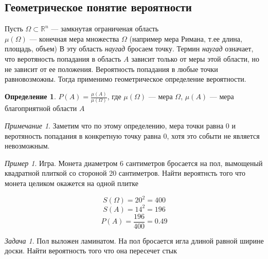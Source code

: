 \documentclass[english]{article}
\newcommand{\R}{\mathbb{R}}
\theoremstyle{plain}
\theoremstyle{remark}
\newtheorem*{remark}{Примечание}
\newtheorem*{task}{Задача}
\newtheorem*{examp}{Пример}
\theoremstyle{definition}
\newtheorem*{definition}{Определение}
\begin{document}
\subsection{Геометрическое понятие вероятности}
\label{sec:orgaa1966d}
Пусть \(\Omega \subset \R^n\)  --- замкнутая ограниченая область \\
\(\mu(\Omega)\) --- конечная мера множества \(\Omega\) (например мера Римана, т.ее длина, площадь, объем) 
В эту область \emph{наугад} бросаем точку. Термин \emph{наугад} означает, что веротяность попадания в область \(A\)
зависит только от меры этой области, но не зависит от ее положения. Вероятность попадания в любые точки равновозможны.
Тогда применимо геометрическое определение вероятности.
\begin{definition}
\(P(A) = \frac{\mu(A)}{\mu(\Omega)}\), где \(\mu(\Omega)\) --- мера \(\Omega\), \(\mu(A)\) --- мера благоприятной области \(A\)
\end{definition}
\begin{remark}
Заметим что по этому определению, мера точки равна \(0\) и веротяность попадания в конкретную точку равна \(0\), хотя это событи не является невозможным.
\end{remark}
\begin{examp}
Игра. Монета диаметром 6 сантиметров бросается на пол, вымощеный
квадратной плиткой со стороной 20 сантиметров. Найти вероятнсть того
что монета целиком окажется на одной плитке
\begin{center}
\end{center}

\[ S(\Omega) = 20^2 = 400 \]
\[ S(A) = 14^2 = 196 \]
\[ P(A) = \frac{196}{400} = 0.49 \]
\end{examp}
\begin{task}
Пол выложен ламинатом. На пол бросается игла длиной равной ширине
доски. Найти вероятность того что она пересечет стык
\end{task}
\end{document}
